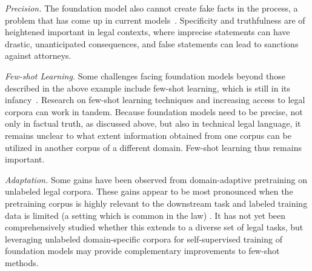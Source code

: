 \medskip

\textit{Precision.} The foundation model also cannot create fake facts in the process, a problem that has come up in current models~\citep{gretz2020workweek,zellers2019neuralfakenews}. Specificity and truthfulness are of heightened important in legal contexts, where imprecise statements can have drastic, unanticipated consequences, and false statements can lead to sanctions against attorneys.

\medskip

\emph{Few-shot Learning.} Some challenges facing foundation models beyond those described in the above example include few-shot learning, which is still in its infancy~\citep{perez2021true}. Research on few-shot learning techniques and increasing access to legal corpora can work in tandem. Because foundation models need to be precise, not only in factual truth, as discussed above, but also in technical legal language, it remains unclear to what extent information obtained from one corpus can be utilized in another corpus of a different domain. Few-shot learning thus remains important.
\medskip

\emph{Adaptation.} Some gains have been observed from domain-adaptive pretraining on unlabeled legal corpora. These gains appear to be most pronounced when the pretraining corpus is highly relevant to the downstream task and labeled training data is limited (a setting which is common in the law) \citep{zheng2021does}. It has not yet been comprehensively studied whether this extends to a diverse set of legal tasks, but leveraging unlabeled domain-specific corpora for self-supervised training of foundation models may provide complementary improvements to few-shot methods.
\medskip

